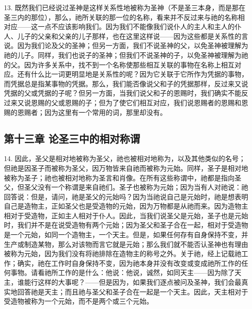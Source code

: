 13. 既然我们已经说过圣神是这样关系性地被称为圣神（不是圣三本身，而是那在圣三内的那位），那么，祂所关联的那一位的名称，看来并不反过来与祂的名称相对应——这一点不应该影响我们。因为我们不能像我们说仆人的主人和主人的仆人、儿子的父亲和父亲的儿子那样，也在这里这样说——因为这些都是关系性的言说。因为我们论及父的圣神；但另一方面，我们不说圣神的父，以免圣神被理解为祂的儿子。同样，我们也说子的圣神；但我们不说圣神的子，以免圣神被理解为祂的父。因为许多关系中，找不到一个名称使那些相互关联的事物在名称上相互对应。还有什么比一词更明显地是关系性的呢？因为它关联于它所作为凭据的事物，而凭据总是指某事物的凭据。那么，我们能否像说父和子的凭据那样，反过来又说凭据的父或凭据的子呢？但另一方面，当我们说父和子的恩赐时，我们确实不能反过来又说恩赐的父或恩赐的子；但为了使它们相互对应，我们说恩赐者的恩赐和恩赐的恩赐者；因为这里有一个常用的词，那里却没有。\par


\subsection{第十三章 论圣三中的相对称谓}

14. 因此，圣父是相对地被称为圣父，祂也被相对地称为，以及其他类似的名号；但祂是因圣子而被称为圣父，因万物皆来自祂而被称为元始。同样，圣子是相对地被称为圣子；祂也被相对地称为圣言和肖像。在所有这些称谓中，祂都是指向圣父，但圣父没有一个称谓是来自祂们。圣子也被称为元始；因为当有人对祂说：祂回答说：但是，请问，祂是圣父的元始吗？因为当祂说自己是元始时，祂是想表明自己是造物主，正如圣父也是受造物的元始，因为万物都是从祂而来。因为造物主相对于受造物，正如主人相对于仆人。因此，当我们说圣父是元始，圣子也是元始时，我们并不是在说受造物有两个元始；因为圣父和圣子合在一起，相对于受造物是一个元始，如同一个造物主，一个天主。但是，如果任何存有自身保持不变，并生产或制造某物，那么对该物而言它就是元始；那么我们就不能否认圣神也有理由被称为元始，因为我们没有将祂排除在造物主的称号之外。关于祂，经上记载祂工作；确实，祂在工作时自身保持不变，因为祂本身并没有改变或变成祂所工作的任何事物。请看祂所工作的是什么：他说：他说，诚然，如同天主——因为除了天主，谁能行这样的大事呢？——但是因为，如果我们逐点被问及圣神，我们会最真实地回答祂是天主；而且祂与圣父和圣子合在一起是一个天主。因此，天主相对于受造物被称为一个元始，而不是两个或三个元始。\par

